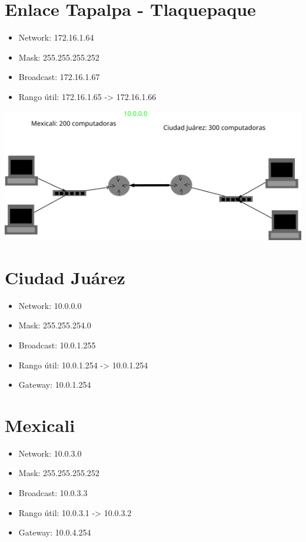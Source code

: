 \documentclass[11pt]{article}
\begin{document}
\section{Enlace Tapalpa - Tlaquepaque}
\label{sec:org6e79ca9}
\begin{itemize}
\item Network: 172.16.1.64
\item Mask: 255.255.255.252
\item Broadcast: 172.16.1.67
\item Rango útil: 172.16.1.65 -> 172.16.1.66
\end{itemize}

\begin{center}
\includegraphics[width=.9\linewidth]{./ejercicio2.png}
\end{center}

\section{Ciudad Juárez}
\label{sec:org52775ec}
\begin{itemize}
\item Network: 10.0.0.0
\item Mask: 255.255.254.0
\item Broadcast: 10.0.1.255
\item Rango útil: 10.0.1.254 -> 10.0.1.254
\item Gateway: 10.0.1.254
\end{itemize}

\section{Mexicali}
\label{sec:org1c023ac}
\begin{itemize}
\item Network: 10.0.3.0
\item Mask: 255.255.255.252
\item Broadcast: 10.0.3.3
\item Rango útil: 10.0.3.1 -> 10.0.3.2
\item Gateway: 10.0.4.254
\end{itemize}
\end{document}
